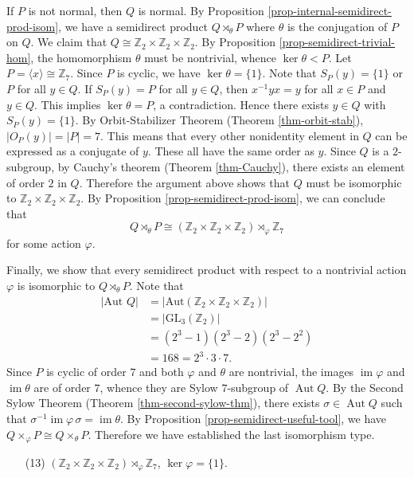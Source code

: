 \begin{example}
	If $P$ is not normal, then $Q$ is normal. By Proposition \ref{prop-internal-semidirect-prod-isom},  we have a semidirect product $Q\rtimes_{\theta} P$ where $\theta$ is the conjugation of $P$ on $Q$. We  claim that $Q\cong \mathbb{Z}_2\times\mathbb{Z}_2\times\mathbb{Z}_2$.  By Proposition \ref{prop-semidirect-trivial-hom},   the homomorphism $\theta$ must be nontrivial, whence $\ker \theta < P$.  Let $P = \langle x\rangle\cong\mathbb{Z}_7$. Since $P$ is cyclic, we have $\ker \theta = \{1\}$. Note that $S_P(y) = \{1\}$ or $P$ for all $y\in Q$. If $S_P(y) = P$ for all $y\in Q$, then $x^{-1}yx = y$ for all $x\in P$ and $y\in Q$. This implies $\operatorname{ker} \theta = P$, a contradiction. Hence there exists $y\in Q$ with $S_P(y) = \{1\}$. By Orbit-Stabilizer Theorem (Theorem \ref{thm-orbit-stab}), $|O_P(y)| = |P| = 7$. This means that every other nonidentity element in $Q$ can be expressed as a conjugate of $y$. These all have the same order as $y$. Since $Q$ is a $2$-subgroup, by Cauchy's theorem (Theorem \ref{thm-Cauchy}), there exists an element of order $2$ in $Q$. Therefore the argument above shows that $Q$ must be isomorphic to $\mathbb{Z}_2\times\mathbb{Z}_2\times\mathbb{Z}_2$. By Proposition \ref{prop-semidirect-prod-isom}, we can conclude that 
	\begin{equation*}
		Q\rtimes_{\theta} P \cong (\mathbb{Z}_2\times\mathbb{Z}_2\times\mathbb{Z}_2) \rtimes_{\varphi} \mathbb{Z}_7
	\end{equation*}
	for some  action $\varphi$.
	
	Finally, we show that every semidirect product  with respect to a nontrivial action $\varphi$ is isomorphic to $ Q\rtimes_{\theta} P$. Note that
	\begin{align*}
		|\text{Aut } Q| &=|\text{Aut} (\mathbb{Z}_2\times\mathbb{Z}_2\times\mathbb{Z}_2)| 
		\\
		&= |\text{GL}_3(\mathbb{Z}_2)| 
		\\
		&= (2^3-1)(2^3-2)(2^3-2^2) 
		\\
		&= 168 = 2^3\cdot 3\cdot 7.
	\end{align*}  Since $P$ is cyclic of order $7$ and both $\varphi$ and $\theta$ are nontrivial, the images $\operatorname{im} \varphi$ and $\operatorname{im} \theta$ are of order $7$, whence they are Sylow $7$-subgroup of $\operatorname{Aut} Q$. By the Second Sylow Theorem (Theorem \ref{thm-second-sylow-thm}), there exists $\sigma\in \operatorname{Aut} Q$ such that $\sigma^{-1} \operatorname{im} \varphi \, \sigma=\operatorname{im} \theta$. By Proposition \ref{prop-semidirect-useful-tool}, we have $Q\times_{\varphi} P \cong Q\times_{\theta} P$. Therefore we have established the last isomorphism type.
	\begin{itemize}
		\item[(13)] $(\mathbb{Z}_2\times\mathbb{Z}_2\times\mathbb{Z}_2) \rtimes_{\varphi} \mathbb{Z}_7$, $\ker\varphi = \{1\}$.
	\end{itemize}
\end{example}




